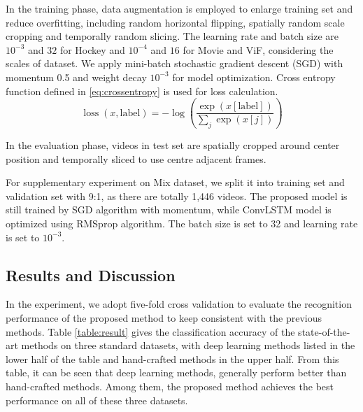 \documentclass[10pt,twocolumn,letterpaper]{article}
\begin{document}
In the training phase, data augmentation is employed to enlarge training set and reduce overfitting, including random horizontal flipping, spatially random scale cropping and temporally random slicing. 
The learning rate and batch size are $10^{-3}$ and $32$ for Hockey and $10^{-4}$ and $16$ for Movie and ViF, considering the scales of dataset.
We apply mini-batch stochastic gradient descent (SGD) with momentum 0.5 and weight decay $10^{-3}$ for model optimization.  
Cross entropy function defined in \ref{eq:crossentropy} is used for loss calculation. 
\begin{equation}
\label{eq:crossentropy}
\operatorname{loss}(x, \text{label}) = -\log \left(\frac{\exp (x[\text{label}])}{\sum_{j} \exp (x[j])}\right)
\end{equation}

In the evaluation phase, videos in test set are spatially cropped around center position and temporally sliced to use centre adjacent frames.

For supplementary experiment on Mix dataset, we split it into training set and validation set with 9:1, as there are totally 1,446 videos. 
The proposed model is still trained by SGD algorithm with momentum, while ConvLSTM \cite{convlstm_sudh} model is optimized using RMSprop algorithm.
The batch size is set to 32 and learning rate is set to $10^{-3}$.

\subsection{Results and Discussion}

In the experiment, we adopt five-fold cross validation to evaluate the recognition performance of the proposed method to keep consistent with the previous methods.
Table \ref{table:result} gives the classification accuracy of the state-of-the-art methods on three standard datasets, with deep learning methods listed in the lower half of the table and hand-crafted methods in the upper half.
From this table, it can be seen that deep learning methods, generally perform better than hand-crafted methods.
Among them, the proposed method achieves the best performance on all of these three datasets.
\end{document}
